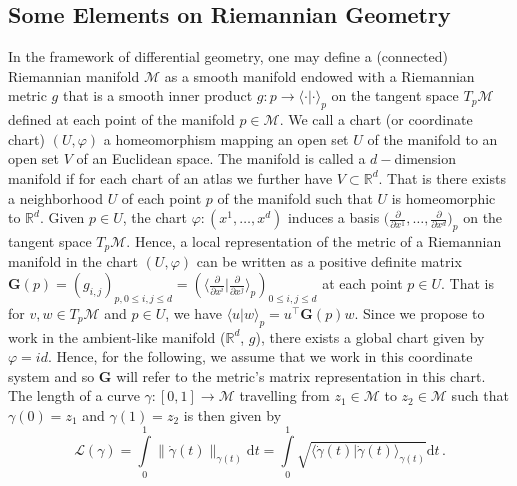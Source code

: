 \documentclass[10pt,journal,compsoc]{IEEEtran}
\begin{document}


\subsection{Some Elements on Riemannian Geometry}

In the framework of differential geometry, one may define a (connected) Riemannian manifold $\mathcal{M}$ as a smooth manifold endowed with a Riemannian metric $g$ that is a smooth inner product $g: p \to \langle \cdot | \cdot \rangle_p$ on the tangent space $T_p\mathcal{M}$ defined at each point of the manifold $p \in \mathcal{M}$. We call a chart (or coordinate chart) $(U, \varphi)$ a homeomorphism mapping an open set $U$ of the manifold to an open set $V$ of an Euclidean space.  The manifold is called a $d-$dimension manifold if for each chart of an atlas we further have $V \subset \mathbb{R}^d$. That is there exists a neighborhood $U$ of each point $p$ of the manifold such that $U$ is homeomorphic to $\mathbb{R}^d$. Given $p \in U$, the chart $\varphi: (x^1, \dots, x^d)$ induces a basis $\Big (\frac{\partial}{\partial x^1}, \dots, \frac{\partial}{\partial x^d} \Big)_p $ on the tangent space $T_p\mathcal{M}$. Hence, a local representation of the metric of a Riemannian manifold in the chart $(U,\varphi)$ can be written as a positive definite matrix $\mathbf{G}(p) = ( g_{i, j})_{p, 0 \leq i, j \leq d} = (\langle \frac{\partial}{\partial x^i} | \frac{\partial}{\partial x^j} \rangle_p)_{0 \leq i, j \leq d}$ at each point $p \in U$. That is for $v, w \in T_p\mathcal{M}$ and $p \in U$, we have $\langle u | w \rangle_p = u^{\top} \mathbf{G}(p) w$. Since we propose to work in the ambient-like manifold ($\mathbb{R}^d$, $g$), there exists a global chart given by $\varphi=id$. Hence, for the following, we assume that we work in this coordinate system and so $\mathbf{G}$  will refer to the metric's matrix representation in this chart. The length of a curve $\gamma: [0, 1] \to \mathcal{M}$ travelling from $z_1 \in \mathcal{M}$ to $z_2 \in \mathcal{M}$ such that $\gamma(0) = z_1$ and $\gamma(1) = z_2$ is then given by 
\[
    \mathcal{L}(\gamma) = \int \limits _0 ^1 \lVert \dot{\gamma}(t) \rVert_{\gamma(t)} \mathrm{d}t = \int \limits _0 ^1 \sqrt{\langle \dot{\gamma}(t) | \dot{\gamma}(t) \rangle_{\gamma(t)}} \mathrm{d}t\,.
\]  
\end{document}
